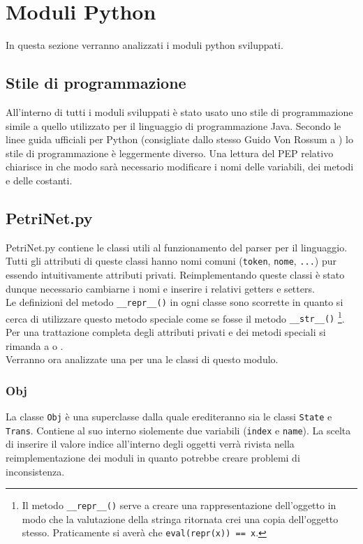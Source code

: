 \documentclass[italian,12pt]{book}
\begin{document}
\section{Moduli Python}
In questa sezione verranno analizzati i moduli python sviluppati.

\subsection{Stile di programmazione}
All'interno di tutti i moduli sviluppati è stato usato uno stile di programmazione simile a quello
utilizzato per il linguaggio di programmazione Java. Secondo le linee guida ufficiali per Python 
(consigliate dallo stesso Guido Von Rossum a \cite{PYTHCODESTYLE}) lo stile di programmazione 
è leggermente diverso. Una lettura del PEP relativo chiarisce in che modo sarà necessario modificare 
i nomi delle variabili, dei metodi e delle costanti.

\subsection{PetriNet.py}
PetriNet.py contiene le classi utili al funzionamento del parser per il linguaggio.\\
Tutti gli attributi di queste classi hanno nomi comuni ({\tt token}, {\tt nome}, {\tt ...}) pur 
essendo intuitivamente attributi privati. Reimplementando queste classi è stato dunque necessario
cambiarne i nomi e inserire i relativi getters e setters. \\
Le definizioni del metodo {\tt \_\_repr\_\_()} in ogni classe sono scorrette in quanto si cerca di 
utilizzare questo metodo speciale come se fosse il metodo {\tt \_\_str\_\_()}
\footnote{Il metodo {\tt \_\_repr\_\_()} serve a creare una rappresentazione dell'oggetto in modo che
la valutazione della stringa ritornata crei una copia dell'oggetto stesso. Praticamente si averà che 
{\tt eval(repr(x)) == x}.}. \\
Per una trattazione completa degli attributi privati e dei metodi speciali 
si rimanda a \cite{PYTH} o \cite {SUMMERFIELD}.\\
Verranno ora analizzate una per una le classi di questo modulo.

\subsubsection{Obj}
La classe {\tt Obj} è una superclasse dalla quale erediteranno sia le classi {\tt State} e 
{\tt Trans}. Contiene al suo interno siolemente due variabili ({\tt index} e {\tt name}). La 
scelta di inserire il valore indice all'interno degli oggetti verrà rivista nella reimplementazione 
dei moduli in quanto potrebbe creare problemi di inconsistenza.
\end{document}
